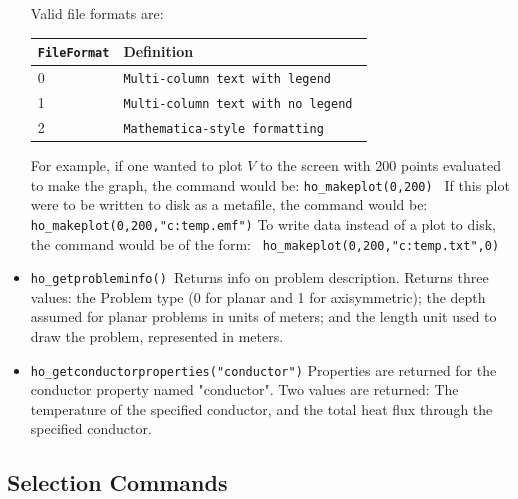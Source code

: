 \begin{itemize}
\vspace*{8pt}
Valid file formats are:

\begin{tabular}{ll}
\texttt{FileFormat} &  Definition  \\ \hline
 0 & \texttt{Multi-column text with legend } \\
 1 & \texttt{Multi-column text with no legend } \\
 2 & \texttt{Mathematica-style formatting}
\end{tabular}

For example, if one wanted to plot $V $ to the screen with 200 points evaluated
to make the graph, the command would be: \newline
\texttt{ho\_makeplot(0,200) } \newline
If this plot were to be written to disk as a metafile, the command
would be:\texttt{ } \newline
\texttt{ho\_makeplot(0,200,"c:temp.emf")} \newline
To write data instead of a plot to disk, the command would be of
the form:\texttt{ } \newline
\texttt{ho\_makeplot(0,200,"c:temp.txt",0)} \newline


\item \texttt{ho\_getprobleminfo() }Returns info on problem description. Returns three
values: the Problem type (0 for planar and 1 for axisymmetric); the depth
assumed for planar problems in units of meters; and the length unit used to draw the problem, represented in meters.

\item \texttt{ho\_getconductorproperties("conductor")} Properties are returned for the
conductor property named "conductor". Two values are returned: The temperature
of the specified conductor, and the total heat flux through the specified
conductor.
\end{itemize}

\subsection{Selection Commands}

